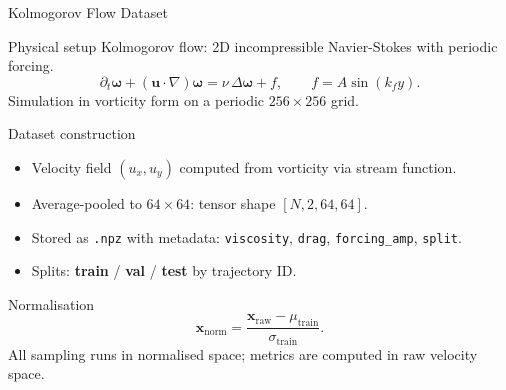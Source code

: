 \documentclass[9pt]{beamer}
\begin{document}
\begin{frame}{Kolmogorov Flow Dataset}
\begin{block}{Physical setup}
Kolmogorov flow: 2D incompressible Navier-Stokes with periodic forcing.
\[
  \partial_t \boldsymbol{\omega} + (\mathbf{u}\cdot\nabla)\boldsymbol{\omega}
    = \nu\,\Delta\boldsymbol{\omega} + f, \qquad f = A\sin(k_f y).
\]
Simulation in vorticity form on a periodic $256\times256$ grid.
\end{block}
\begin{block}{Dataset construction}
\begin{itemize}
  \item Velocity field $(u_x, u_y)$ computed from vorticity via stream function.
  \item Average-pooled to $64\times64$: tensor shape $[N, 2, 64, 64]$.
  \item Stored as \texttt{.npz} with metadata: \texttt{viscosity}, \texttt{drag}, \texttt{forcing\_amp}, \texttt{split}.
  \item Splits: \textbf{train} / \textbf{val} / \textbf{test} by trajectory ID.
\end{itemize}
\end{block}
\begin{block}{Normalisation}
\[
  \mathbf{x}_\text{norm} = \frac{\mathbf{x}_\text{raw} - \mu_\text{train}}{\sigma_\text{train}}.
\]
All sampling runs in normalised space; metrics are computed in raw velocity space.
\end{block}
\end{frame}

\end{document}

